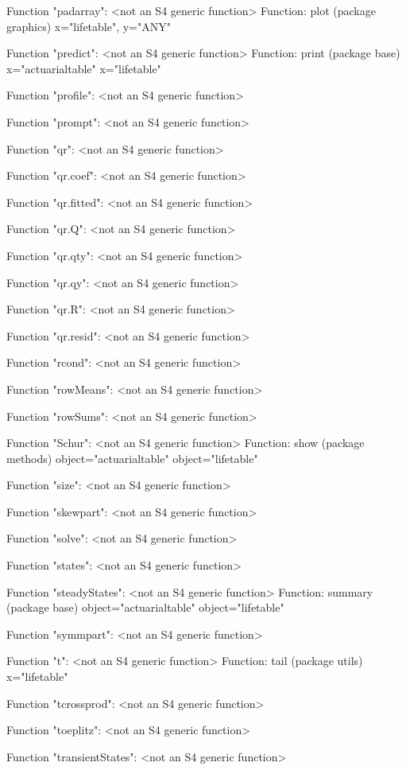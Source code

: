 \documentclass[nojss]{jss}
\begin{document}
\begin{Schunk}
\begin{Soutput}
Function "padarray":
 <not an S4 generic function>
Function: plot (package graphics)
x="lifetable", y="ANY"


Function "predict":
 <not an S4 generic function>
Function: print (package base)
x="actuarialtable"
x="lifetable"


Function "profile":
 <not an S4 generic function>

Function "prompt":
 <not an S4 generic function>

Function "qr":
 <not an S4 generic function>

Function "qr.coef":
 <not an S4 generic function>

Function "qr.fitted":
 <not an S4 generic function>

Function "qr.Q":
 <not an S4 generic function>

Function "qr.qty":
 <not an S4 generic function>

Function "qr.qy":
 <not an S4 generic function>

Function "qr.R":
 <not an S4 generic function>

Function "qr.resid":
 <not an S4 generic function>

Function "rcond":
 <not an S4 generic function>

Function "rowMeans":
 <not an S4 generic function>

Function "rowSums":
 <not an S4 generic function>

Function "Schur":
 <not an S4 generic function>
Function: show (package methods)
object="actuarialtable"
object="lifetable"


Function "size":
 <not an S4 generic function>

Function "skewpart":
 <not an S4 generic function>

Function "solve":
 <not an S4 generic function>

Function "states":
 <not an S4 generic function>

Function "steadyStates":
 <not an S4 generic function>
Function: summary (package base)
object="actuarialtable"
object="lifetable"


Function "symmpart":
 <not an S4 generic function>

Function "t":
 <not an S4 generic function>
Function: tail (package utils)
x="lifetable"


Function "tcrossprod":
 <not an S4 generic function>

Function "toeplitz":
 <not an S4 generic function>

Function "transientStates":
 <not an S4 generic function>


\end{Soutput}
\end{Schunk}
\end{document}
